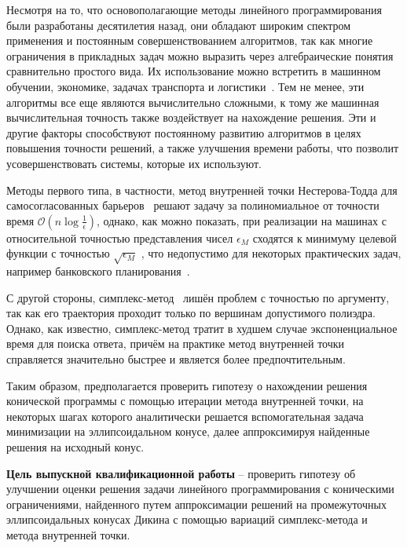 Несмотря на то, что основополагающие методы линейного программирования были разработаны десятилетия назад, они обладают широким спектром применения и постоянным совершенствованием алгоритмов, так как многие ограничения в прикладных задач можно выразить через алгебраические понятия сравнительно простого вида. Их использование можно встретить в машинном обучении, экономике, задачах транспорта и логистики~\cite{tsiotas2023; floudas2005}. Тем не менее, эти алгоритмы все еще являются вычислительно сложными, к тому же машинная вычислительная точность также воздействует на нахождение решения. Эти и другие факторы способствуют постоянному развитию алгоритмов в целях повышения точности решений, а также улучшения времени работы, что позволит усовершенствовать системы, которые их используют.

Методы первого типа, в частности, метод внутренней точки Нестерова-Тодда для самосогласованных барьеров~\cite{nesterov1998} решают задачу за полиномиальное от точности время $\mathcal{O} (n \log\frac{1}{\epsilon}) $, однако, как можно показать, при реализации на машинах с относительной точностью представления чисел $ \epsilon_M $ сходятся к минимуму целевой функции с точностью $ \sqrt{\epsilon_M} $ , что недопустимо для некоторых практических задач, например банковского планирования~\cite{tsionas2023}.

С другой стороны, симплекс-метод~\cite{ficken2015} лишён проблем с точностью по аргументу, так как его траектория проходит только по вершинам допустимого полиэдра. Однако, как известно, симплекс-метод тратит в худшем случае экспоненциальное время для поиска ответа, причём на практике метод внутренней точки справляется значительно быстрее и является более предпочтительным.

Таким образом, предполагается проверить гипотезу о нахождении решения конической программы с помощью итерации метода внутренней точки, на некоторых шагах которого аналитически решается вспомогательная задача минимизации на эллипсоидальном конусе, далее аппроксимируя найденные решения на исходный конус. 

\textbf{Цель выпускной квалификационной работы} -- проверить гипотезу об улучшении оценки решения задачи линейного программирования с коническими ограничениями, найденного путем аппроксимации решений на промежуточных эллипсоидальных конусах Дикина с помощью вариаций симплекс-метода и метода внутренней точки.

